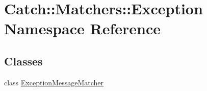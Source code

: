 \hypertarget{namespace_catch_1_1_matchers_1_1_exception}{}\section{Catch\+:\+:Matchers\+:\+:Exception Namespace Reference}
\label{namespace_catch_1_1_matchers_1_1_exception}
\subsection*{Classes}
\begin{DoxyCompactItemize}
\item 
class \mbox{\hyperlink{class_catch_1_1_matchers_1_1_exception_1_1_exception_message_matcher}{Exception\+Message\+Matcher}}
\end{DoxyCompactItemize}
